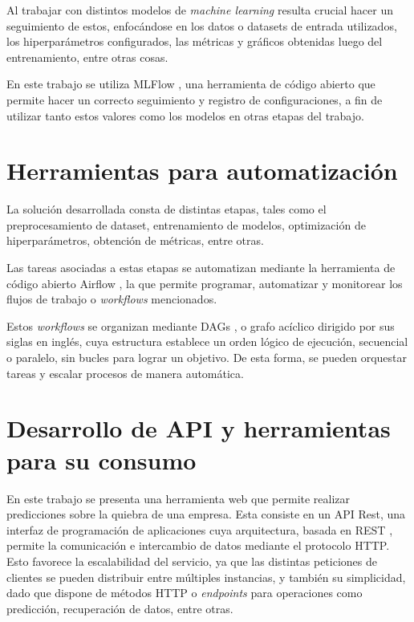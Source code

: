 Al trabajar con distintos modelos de \textit{machine learning} resulta crucial hacer un seguimiento de estos, enfocándose en los datos o datasets de entrada utilizados, los hiperparámetros configurados, las métricas y gráficos obtenidas luego del entrenamiento, entre otras cosas.

En este trabajo se utiliza MLFlow \citep{WEBSITE:mlflow}, una herramienta de código abierto que permite hacer un correcto seguimiento y registro de configuraciones, a fin de utilizar tanto estos valores como los modelos en otras etapas del trabajo.

\section{Herramientas para automatización}

La solución desarrollada consta de distintas etapas, tales como el preprocesamiento de dataset, entrenamiento de modelos, optimización de hiperparámetros, obtención de métricas, entre otras.

Las tareas asociadas a estas etapas se automatizan mediante la herramienta de código abierto Airflow \citep{WEBSITE:airflow}, la que permite programar, automatizar y monitorear los flujos de trabajo o \textit{workflows} mencionados.

Estos \textit{workflows} se organizan mediante DAGs \citep{WEBSITE:definicion_dags}, o grafo acíclico dirigido por sus siglas en inglés, cuya estructura establece un orden lógico de ejecución, secuencial o paralelo, sin bucles para lograr un objetivo. De esta forma, se pueden orquestar tareas y escalar procesos de manera automática.

\section{Desarrollo de API y herramientas para su consumo}

En este trabajo se presenta una herramienta web que permite realizar predicciones sobre la quiebra de una empresa. Esta consiste en un API Rest, una interfaz de programación de aplicaciones cuya arquitectura, basada en REST \citep{article:rest-api}, permite la comunicación e intercambio de datos mediante el protocolo HTTP. Esto favorece la escalabilidad del servicio, ya que las distintas peticiones de clientes se pueden distribuir entre múltiples instancias, y también su simplicidad, dado que dispone de métodos HTTP o \textit{endpoints} para operaciones como predicción, recuperación de datos, entre otras. 

